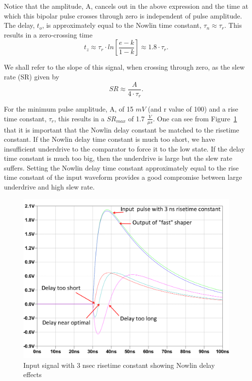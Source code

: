 \documentclass[12pt,oneside,final]{siuethesis}
\theoremstyle{definition}
\begin{document}
Notice that the amplitude, A, cancels out in the above expression and the time at which this bipolar pulse crosses through zero is independent of pulse amplitude. The delay, $t_{o}$, is approximately equal to the Nowlin time constant, $\tau_{n} \approx \tau_{r}$. This results in a zero-crossing time
\begin{equation}
t_z \approx \tau_r \cdot ln \left[ \frac{e - k}{1-k}\right] \approx 1.8 \cdot \tau_r.
\end{equation}

We shall refer to the slope of this signal, when crossing through zero, as the slew rate (SR) given by
\begin{equation}
SR \approx \frac{A}{4 \cdot \tau_r}.
\end{equation}

For the minimum pulse amplitude, A, of 15 $mV$ (and r value of 100) and a rise time constant, $\tau_r$, this results in a $SR_{max}$ of 1.7 $\frac{V}{\mu s}$. One can see from Figure~\ref{fig:nowlinout} that it is important that the Nowlin delay constant be matched to the risetime constant. If the Nowlin delay time constant is much too short, we have insufficient underdrive to the comparator to force it to the low state.  If the delay time constant is much too big, then the underdrive is large but the slew rate suffers. Setting the Nowlin delay time constant approximately equal to the rise time constant of the input waveform provides a good compromise between large underdrive and high slew rate.

\begin{figure}[htbp!]
\centering
\includegraphics[scale=.45,keepaspectratio=true]{./ch2_figures/nowlin.png} 
\caption{Input signal with 3 nsec risetime constant showing Nowlin delay effects}
\label{fig:nowlinout}
\end{figure}
\end{document}
